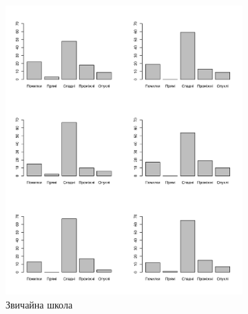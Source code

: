 \begin{figure}[h]
  \centering
  \begin{subfigure}[b]{0.45\textwidth}
    \includegraphics[width=\textwidth]{images/poisson_types}
    \caption{Звичайна школа}
    \label{fig:tapping:poisson:types}
  \end{subfigure}
  \begin{subfigure}[b]{0.45\textwidth}

\end{subfigure}
\end{figure}

